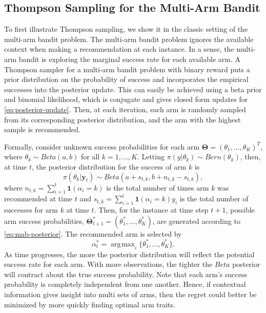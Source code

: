 \documentclass[12pt]{article}
\DeclareMathOperator*{\argmax}{\arg\!\max}
\begin{document}
\subsection{Thompson Sampling for the Multi-Arm Bandit}

To first illustrate Thompson sampling, we show it in the classic setting of the 
multi-arm bandit problem. 
The multi-arm bandit problem ignores the available context when making a 
recommendation at each instance.
In a sense, the multi-arm bandit is exploring the marginal success rate for each
available arm.
A Thompson sampler for a multi-arm bandit problem with binary reward puts a prior
distribution on the probability of success and incorporates the empirical successes
into the posterior update.
This can easily be achieved using a beta prior and binomial likelihood, which is
conjugate and gives closed form updates for \eqref{eq:posterior-update}.
Then, at each iteration, each arm is randomly sampled from its corresponding 
posterior distribution, and the arm with the highest sample is recommended.

Formally, consider unknown success probabilities for each arm 
$\bm{\Theta} = (\theta_1, \ldots, \theta_K)^T$,
where 
$\theta_k \sim Beta(a,b)$
for all $k = 1, \ldots, K$.
Letting 
$\pi(y \vert \theta_k) \sim Bern(\theta_k)$, 
then, at time $t$, the posterior distribution for the success of arm $k$ is
\begin{equation}
\pi(\theta_k \vert \bm{y}_t) \sim 
Beta(a + s_{t,k}, b + n_{t,k} - s_{t,k}),
\label{eq:mab-posterior}
\end{equation}
where 
$n_{t,k} = \sum_{i = 1}^{t} \bm{1}(\alpha_i = k)$
is the total number of times arm $k$ was recommended at time $t$
and
$s_{t,k} = \sum_{i = 1}^{t} \bm{1}(\alpha_i = k) y_i$ 
is the total number of successes for arm $k$ at time $t$.
Then, for the instance at time step $t + 1$, possible arm success probabilities,
$\bm{\Theta}_{t+1}^* = (\theta_1^*, \ldots, \theta_K^*)$,
are generated according to \eqref{eq:mab-posterior}.
The recommended arm is selected by 
\begin{equation}
\alpha_t^* = \argmax_i \{\theta_1^*, \ldots, \theta_K^*\}.
\end{equation}
As time progresses, the more the posterior distribution will reflect the potential 
success rate for each arm.
With more observations, the tighter the $Beta$ posterior will contract about the 
true success probability.
Note that each arm's success probability is completely independent from one 
another.
Hence, if contextual information gives insight into multi sets of arms, then the
regret could better be minimized by more quickly finding optimal arm traits.
\end{document}
